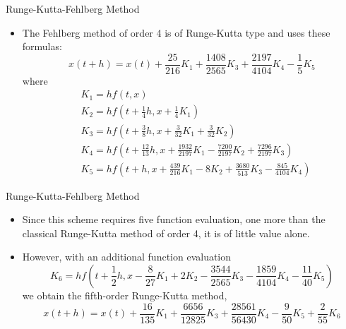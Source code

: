 \documentclass{beamer}
\newcommand{\beforeverb}{\footnotesize}
\newcommand{\afterverb}{\normalsize}
\begin{document}
\begin{frame}{Runge-Kutta-Fehlberg Method}
\begin{itemize}
\item The Fehlberg method of order 4 is of Runge-Kutta type and uses these formulas:
\[
x(t+h)=x(t)+\frac{25}{216} K_1+\frac{1408}{2565} K_3+\frac{2197}{4104}K_4-\frac{1}{5}K_5
\]
where
\beforeverb
\begin{align*}
&K_1=hf(t,x)\\  
&K_2=hf\left(t+\frac{1}{4}h,x+\frac{1}{4} K_1\right)\\
&K_3=hf\left(t+\frac{3}{8}h,x+\frac{3}{32} K_1+\frac{3}{32} K_2\right)   \\
&K_4=hf\left(t+\frac{12}{13}h,x+\frac{1932}{2197} K_1-\frac{7200}{2197} K_2 + \frac{7296}{2197}K_3\right)   \\
&K_5=hf\left(t+h,x+\frac{439}{216} K_1-8 K_2 + \frac{3680}{513}K_3-\frac{845}{4104}K_4\right)  
\end{align*}
\end{itemize}
\end{frame}
\begin{frame}{Runge-Kutta-Fehlberg Method}
\begin{itemize}
\item Since this scheme requires \alert{five} function evaluation, one more than the classical Runge-Kutta method of order 4, it is of little value alone. 
\item However, with an additional function evaluation
\beforeverb
\[
K_6=hf\left(t+\frac{1}{2}h,x-\frac{8}{27} K_1+2 K_2 - \frac{3544}{2565}K_3-\frac{1859}{4104}K_4-\frac{11}{40}K_5\right)  
\]
\afterverb
we obtain the \alert{fifth-order Runge-Kutta method},
\[
x(t+h)=x(t)+\frac{16}{135} K_1+\frac{6656}{12825} K_3+\frac{28561}{56430}K_4-\frac{9}{50}K_5+\frac{2}{55} K_6
\]
\end{itemize}
\end{frame}
\end{document}

